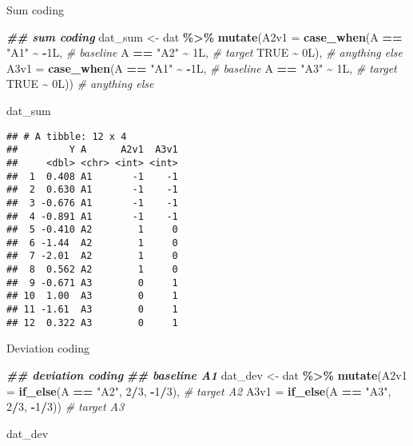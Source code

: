 \documentclass[
]{article}
\newenvironment{Shaded}{\begin{snugshade}}{\end{snugshade}}
\newcommand{\AttributeTok}[1]{\textcolor[rgb]{0.13,0.29,0.53}{#1}}
\newcommand{\CommentTok}[1]{\textcolor[rgb]{0.56,0.35,0.01}{\textit{#1}}}
\newcommand{\ConstantTok}[1]{\textcolor[rgb]{0.56,0.35,0.01}{#1}}
\newcommand{\DecValTok}[1]{\textcolor[rgb]{0.00,0.00,0.81}{#1}}
\newcommand{\DocumentationTok}[1]{\textcolor[rgb]{0.56,0.35,0.01}{\textbf{\textit{#1}}}}
\newcommand{\FunctionTok}[1]{\textcolor[rgb]{0.13,0.29,0.53}{\textbf{#1}}}
\newcommand{\NormalTok}[1]{#1}
\newcommand{\OtherTok}[1]{\textcolor[rgb]{0.56,0.35,0.01}{#1}}
\newcommand{\SpecialCharTok}[1]{\textcolor[rgb]{0.81,0.36,0.00}{\textbf{#1}}}
\newcommand{\StringTok}[1]{\textcolor[rgb]{0.31,0.60,0.02}{#1}}
\begin{document}
Sum coding

\begin{Shaded}
\begin{Highlighting}[]
\DocumentationTok{\#\# sum coding}
\NormalTok{dat\_sum }\OtherTok{\textless{}{-}}\NormalTok{ dat }\SpecialCharTok{\%\textgreater{}\%}
  \FunctionTok{mutate}\NormalTok{(}\AttributeTok{A2v1 =} \FunctionTok{case\_when}\NormalTok{(A }\SpecialCharTok{==} \StringTok{"A1"} \SpecialCharTok{\textasciitilde{}} \SpecialCharTok{{-}}\NormalTok{1L, }\CommentTok{\# baseline}
\NormalTok{                          A }\SpecialCharTok{==} \StringTok{"A2"} \SpecialCharTok{\textasciitilde{}}\NormalTok{ 1L,  }\CommentTok{\# target}
                          \ConstantTok{TRUE}      \SpecialCharTok{\textasciitilde{}}\NormalTok{ 0L), }\CommentTok{\# anything else}
         \AttributeTok{A3v1 =} \FunctionTok{case\_when}\NormalTok{(A }\SpecialCharTok{==} \StringTok{"A1"} \SpecialCharTok{\textasciitilde{}} \SpecialCharTok{{-}}\NormalTok{1L, }\CommentTok{\# baseline}
\NormalTok{                          A }\SpecialCharTok{==} \StringTok{"A3"} \SpecialCharTok{\textasciitilde{}}\NormalTok{  1L, }\CommentTok{\# target}
                          \ConstantTok{TRUE}      \SpecialCharTok{\textasciitilde{}}\NormalTok{ 0L)) }\CommentTok{\# anything else}

\NormalTok{dat\_sum}
\end{Highlighting}
\end{Shaded}

\begin{verbatim}
## # A tibble: 12 x 4
##         Y A      A2v1  A3v1
##     <dbl> <chr> <int> <int>
##  1  0.408 A1       -1    -1
##  2  0.630 A1       -1    -1
##  3 -0.676 A1       -1    -1
##  4 -0.891 A1       -1    -1
##  5 -0.410 A2        1     0
##  6 -1.44  A2        1     0
##  7 -2.01  A2        1     0
##  8  0.562 A2        1     0
##  9 -0.671 A3        0     1
## 10  1.00  A3        0     1
## 11 -1.61  A3        0     1
## 12  0.322 A3        0     1
\end{verbatim}

Deviation coding

\begin{Shaded}
\begin{Highlighting}[]
\DocumentationTok{\#\# deviation coding}
\DocumentationTok{\#\# baseline A1}
\NormalTok{dat\_dev }\OtherTok{\textless{}{-}}\NormalTok{ dat }\SpecialCharTok{\%\textgreater{}\%}
  \FunctionTok{mutate}\NormalTok{(}\AttributeTok{A2v1 =} \FunctionTok{if\_else}\NormalTok{(A }\SpecialCharTok{==} \StringTok{"A2"}\NormalTok{, }\DecValTok{2}\SpecialCharTok{/}\DecValTok{3}\NormalTok{, }\SpecialCharTok{{-}}\DecValTok{1}\SpecialCharTok{/}\DecValTok{3}\NormalTok{), }\CommentTok{\# target A2}
         \AttributeTok{A3v1 =} \FunctionTok{if\_else}\NormalTok{(A }\SpecialCharTok{==} \StringTok{"A3"}\NormalTok{, }\DecValTok{2}\SpecialCharTok{/}\DecValTok{3}\NormalTok{, }\SpecialCharTok{{-}}\DecValTok{1}\SpecialCharTok{/}\DecValTok{3}\NormalTok{)) }\CommentTok{\# target A3}

\NormalTok{dat\_dev}
\end{Highlighting}
\end{Shaded}
\end{document}
